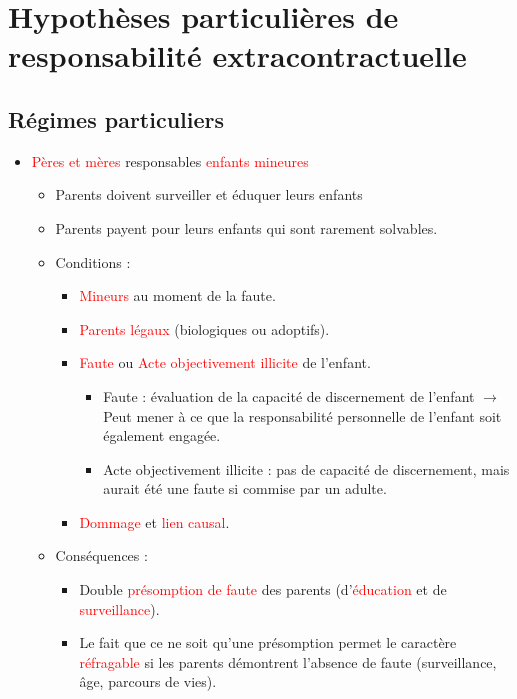 \section{Hypothèses particulières de responsabilité extracontractuelle}

\subsection{Régimes particuliers}
\begin{itemize}
	\item \textcolor{red}{Pères et mères} responsables \textcolor{red}{enfants mineures}
	\begin{itemize}
		\item Parents doivent surveiller et éduquer leurs enfants
		\item Parents payent pour leurs enfants qui sont rarement solvables.
		\item Conditions :
		\begin{itemize}
			\item \textcolor{red}{Mineurs} au moment de la faute.
			\item \textcolor{red}{Parents légaux} (biologiques ou adoptifs).
			\item \textcolor{red}{Faute} ou \textcolor{red}{Acte objectivement illicite} de l'enfant.
			\begin{itemize}
				\item Faute : évaluation de la capacité de discernement de l'enfant $\rightarrow$ Peut mener à ce que la responsabilité personnelle de l'enfant soit également engagée.
				\item Acte objectivement illicite : pas de capacité de discernement, mais aurait été une faute si commise par un adulte.
			\end{itemize}
			\item \textcolor{red}{Dommage} et \textcolor{red}{lien causal}.
		\end{itemize}
	    \item Conséquences :
	    \begin{itemize}
	    	\item Double \textcolor{red}{présomption de faute} des parents (d'\textcolor{red}{éducation} et de \textcolor{red}{surveillance}).
	    	\item Le fait que ce ne soit qu'une présomption permet le caractère \textcolor{red}{réfragable} si les parents démontrent l'absence de faute (surveillance, âge, parcours de vies).
	    \end{itemize}

\end{itemize}
\end{itemize}
